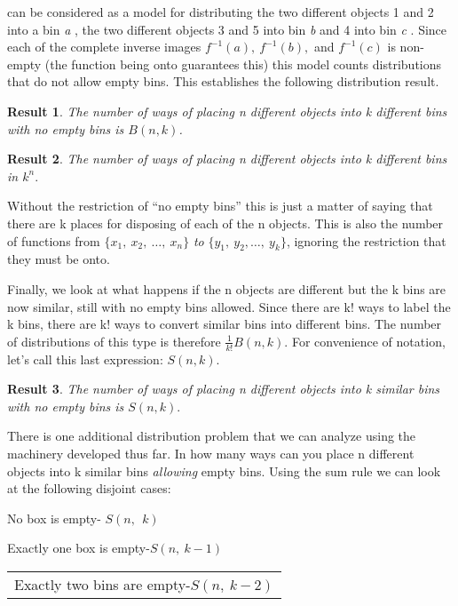 \documentclass[10pt,letter]{article}
\newtheorem{result}{Result}[section]
\renewenvironment{quote}
  {\begin{tabular}{|p{13cm}}}
  {\end{tabular}}
\begin{document}
can be considered as a model for distributing the two different objects
1 and 2 into a bin \emph{a} , the two different objects 3 and 5 into bin
\emph{b} and 4 into bin \emph{c} . Since each of the complete inverse
images \(f^{- 1}\left( a \right),\ f^{- 1}\left( b \right),\) and
\(f^{- 1}(c)\) is non-empty (the function being onto guarantees this)
this model counts distributions that do not allow empty bins. This
establishes the following distribution result.

\begin{result}
	 The number of ways of placing \emph{n} different objects into
\emph{k} different bins with no empty bins is \(B(n,k)\).
\end{result}
\begin{result}
	 The number of ways of placing n different objects into k
different bins in \(k^{n}.\)
\end{result}
Without the restriction of ``no empty bins'' this is just a matter of
saying that there are k places for disposing of each of the n objects.
This is also the number of functions from
\(\{ x_{1},\ x_{2},\ \ldots,\ x_{n}\}\) \emph{to}
\(\{ y_{1},\ y_{2},\ldots,\ y_{k}\}\), ignoring the restriction that
they must be onto.

Finally, we look at what happens if the n objects are different but the
k bins are now similar, still with no empty bins allowed. Since there
are k! ways to label the k bins, there are k! ways to convert similar
bins into different bins. The number of distributions of this type is
therefore \(\frac{1}{k!}B(n,k)\). For convenience of notation, let's
call this last expression: \(S\left( n,k \right).\)

\begin{result}
	 The number of ways of placing n different objects into k similar
bins with no empty bins is \(S\left( n,k \right).\)
\end{result}

There is one additional distribution problem that we can analyze using
the machinery developed thus far. In how many ways can you place n
different objects into k similar bins \emph{allowing} empty bins. Using
the sum rule we can look at the following disjoint cases:

No box is empty- \(S(n,\ \ k)\)

Exactly one box is empty-\(S(n,\ k - 1)\)
\begin{quote}
Exactly two bins are empty-\(S(n,\ k - 2)\)

\end{quote}
\end{document}
